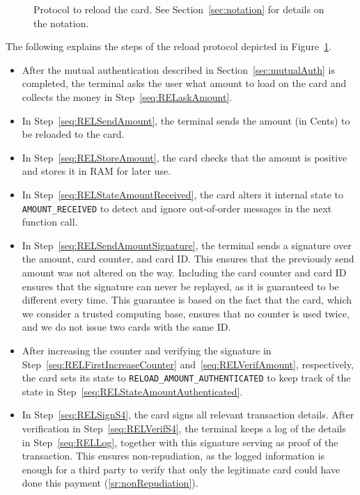 \documentclass{article}
\begin{document}
\begin{figure}
    \centering
    
    \caption{Protocol to reload the card.
    See Section~\ref{sec:notation} for details on the notation.
    }
    \label{fig:ReloadProtocol}
\end{figure}

The following explains the steps of the reload protocol depicted in Figure~\ref{fig:ReloadProtocol}.

\begin{itemize}
    \item After the mutual authentication described in Section~\ref{sec:mutualAuth} is completed, the terminal asks the user what amount to load on the card and collects the money in Step~\ref{seq:RELaskAmount}.
    \item In Step~\ref{seq:RELSendAmount}, the terminal sends the amount (in Cents) to be reloaded to the card.
    \item In Step~\ref{seq:RELStoreAmount}, the card checks that the amount is positive and stores it in RAM for later use.
    \item In Step~\ref{seq:RELStateAmountReceived}, the card alters it internal state to \texttt{AMOUNT\_RECEIVED} to detect and ignore out-of-order messages in the next function call.

    \item In Step~\ref{seq:RELSendAmountSignature}, the terminal sends a signature over the amount, card counter, and card ID\@.
          This ensures that the previously send amount was not altered on the way.
          Including the card counter and card ID ensures that the signature can never be replayed, as it is guaranteed to be different every time.
          This guarantee is based on the fact that the card, which we consider a trusted computing base, ensures that no counter is used twice, and we do not issue two cards with the same ID\@.

    \item After increasing the counter and verifying the signature in Step~\ref{seq:RELFirstIncreaseCounter} and~\ref{seq:RELVerifAmount}, respectively, the card sets its state to \texttt{RELOAD\_AMOUNT\_AUTHENTICATED} to keep track of the state in Step~\ref{seq:RELStateAmountAuthenticated}.

    \item In Step~\ref{seq:RELSignS4}, the card signs all relevant transaction details.
    After verification in Step~\ref{seq:RELVerifS4}, the terminal keeps a log of the details in Step~\ref{seq:RELLog}, together with this signature serving as proof of the transaction.
    This ensures non-repudiation, as the logged information is enough for a third party to verify that only the legitimate card could have done this payment (\ref{sr:nonRepudiation}).


\end{itemize}
\end{document}
